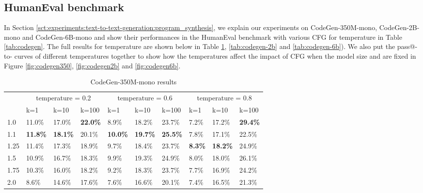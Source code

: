 \documentclass{article}
\begin{document}
\subsection{HumanEval benchmark}\label{appendix:charts:humaneval}
In Section \ref{sct:experiments:text-to-text-generation:program_synthesis}, we explain our experiments on CodeGen-350M-mono, CodeGen-2B-mono and CodeGen-6B-mono and show their performances in the HumanEval benchmark with various CFG for temperature  in Table \ref{tab:codegen}. The full results for temperature  are shown below in Table \ref{tab:codegen-350}, \ref{tab:codegen-2b} and \ref{tab:codegen-6b}). We also put the pass@-to- curves of different temperatures together to show how the temperatures affect the impact of CFG when the model size and  are fixed in Figure \ref{fig:codegen350}, \ref{fig:codegen2b} and \ref{fig:codegen6b}.

\begin{table}[t]
    \centering
    \begin{tabular}{llllllllll}
        \toprule
         & \multicolumn{3}{c}{temperature = 0.2} & \multicolumn{3}{c}{temperature = 0.6} & \multicolumn{3}{c}{temperature = 0.8} \\
         \cmidrule(r){2-4} \cmidrule(r){5-7} \cmidrule(r){8-10}
         & k=1 & k=10 & k=100 & k=1 & k=10 & k=100 & k=1 & k=10 & k=100 \\
        \midrule
        1.0 & 11.0\% & 17.0\% & \textbf{22.0\%} & 8.9\% & 18.2\% & 23.7\% & 7.2\% & 17.2\% & \textbf{29.4\%} \\
        1.1 & \textbf{11.8\%} & \textbf{18.1\%} & 20.1\% & \textbf{10.0\%} & \textbf{19.7\%} & \textbf{25.5\%} & 7.8\% & 17.1\% & 22.5\% \\
        1.25 & 11.4\% & 17.3\% & 18.9\% & 9.7\% & 18.4\% & 23.7\% & \textbf{8.3\%} & \textbf{18.2\%} & 24.9\% \\
        1.5 & 10.9\% & 16.7\% & 18.3\% & 9.9\% & 19.3\% & 24.9\% & 8.0\% & 18.0\% & 26.1\% \\
        1.75 & 10.3\% & 16.0\% & 18.2\% & 9.2\% & 18.3\% & 23.7\% & 7.7\% & 16.9\% & 24.2\% \\
        2.0 & 8.6\% & 14.6\% & 17.6\% & 7.6\% & 16.6\% & 20.1\% & 7.4\% & 16.5\% & 21.3\% \\
        \bottomrule
    \end{tabular}
    \caption{CodeGen-350M-mono results}
    \label{tab:codegen-350}
\end{table}
\end{document}
